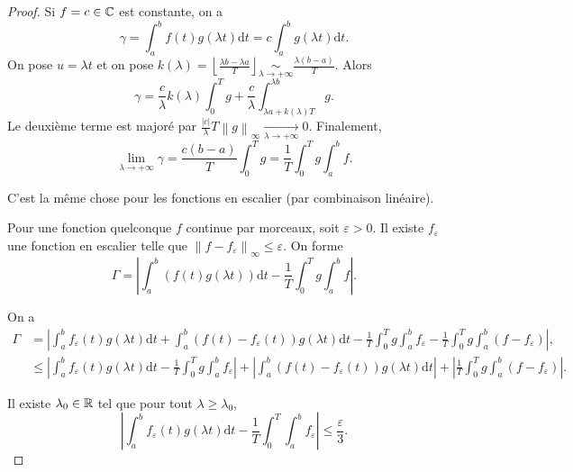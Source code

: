 \begin{proof}
    Si $f=c\in\mathbb{C}$ est constante, on a 
    \begin{equation}
        \gamma=\int_{a}^{b}f(t)g(\lambda t)\mathrm{d}t=c\int_{a}^{b}g(\lambda t)\mathrm{d}t.
    \end{equation}
    On pose $u=\lambda t$ et on pose $k(\lambda)=\left\lfloor\frac{\lambda b-\lambda a}{T}\right\rfloor\underset{\lambda\to+\infty}{\sim}\frac{\lambda(b-a)}{T}$. Alors 
    \begin{equation}
        \gamma=\frac{c}{\lambda}k(\lambda)\int_{0}^{T}g+\frac{c}{\lambda}\int_{\lambda a+k(\lambda)T}^{\lambda b}g.
    \end{equation}
    Le deuxième terme est majoré par $\frac{\left\lvert c\right\rvert}{\lambda}T\left\lVert g\right\rVert_{\infty}\xrightarrow[\lambda\to+\infty]{}0$. Finalement,
    \begin{equation}
        \lim\limits_{\lambda\to+\infty}\gamma=\frac{c(b-a)}{T}\int_{0}^{T}g=\frac{1}{T}\int_{0}^{T}g\int_{a}^{b}f.
    \end{equation}

    C'est la même chose pour les fonctions en escalier (par combinaison linéaire).

    Pour une fonction quelconque $f$ continue par morceaux, soit $\varepsilon>0$. Il existe $f_{\varepsilon}$ une fonction en escalier telle que $\left\lVert f-f_{\varepsilon}\right\rVert_{\infty}\leqslant\varepsilon$. On forme 
    \begin{equation}
        \Gamma=\left\lvert\int_{a}^{b}(f(t)g(\lambda t))\mathrm{d}t-\frac{1}{T}\int_{0}^{T}g\int_{a}^{b}f\right\rvert.
    \end{equation}

    On a 
    \begin{align}
        \Gamma
        &=\left\lvert \int_{a}^{b}f_{\varepsilon}(t)g(\lambda t)\mathrm{d}t+\int_{a}^{b}(f(t)-f_{\varepsilon}(t))g(\lambda t)\mathrm{d}t-\frac{1}{T}\int_{0}^{T}g\int_{a}^{b}f_{\varepsilon}-\frac{1}{T}\int_{0}^{T}g\int_{a}^{b}(f-f_{\varepsilon})\right\rvert,\\
        &\leqslant \left\lvert \int_{a}^{b}f_{\varepsilon}(t)g(\lambda t)\mathrm{d}t-\frac{1}{T}\int_{0}^{T}g\int_{a}^{b}f_{\varepsilon}\right\rvert+\left\lvert \int_{a}^{b}(f(t)-f_{\varepsilon}(t))g(\lambda t)\mathrm{d}t\right\rvert+\left\lvert\frac{1}{T}\int_{0}^{T}g\int_{a}^{b}(f-f_{\varepsilon})\right\rvert.
    \end{align}

    Il existe $\lambda_{0}\in\mathbb{R}$ tel que pour tout $\lambda\geqslant\lambda_{0}$,
    \begin{equation}
        \left\lvert\int_{a}^{b}f_{\varepsilon}(t)g(\lambda t)\mathrm{d}t-\frac{1}{T}\int_{0}^{T}\int_{a}^{b}f_{\varepsilon}\right\rvert\leqslant\frac{\varepsilon}{3}.
    \end{equation}


\end{proof}
